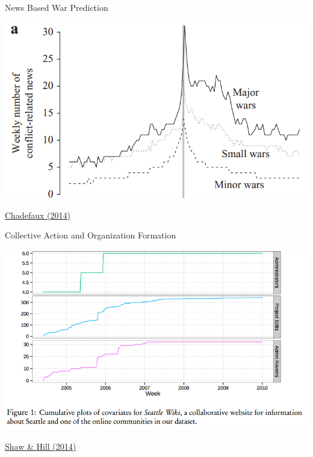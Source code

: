\documentclass[ignorenonframetext,]{beamer}
\begin{document}
\begin{frame}{News Based War Prediction}

\includegraphics{fig/chadefaux.png}

\href{http://jpr.sagepub.com/content/51/1/5.full}{Chadefaux (2014)}

\end{frame}

\begin{frame}{Collective Action and Organization Formation}

\includegraphics{fig/shawhill.png}

\href{https://mako.cc/academic/}{Shaw \& Hill (2014)}

\end{frame}
\end{document}
